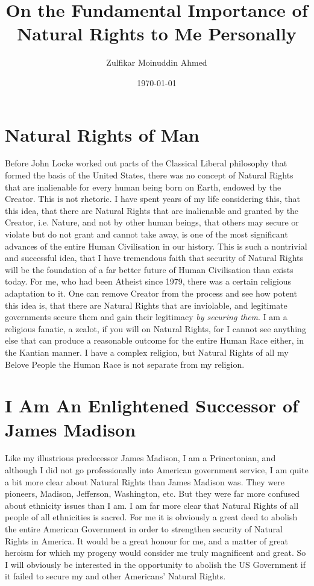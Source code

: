 \documentclass{amsart}
\title{On the Fundamental Importance of Natural Rights to Me Personally}
\author{Zulfikar Moinuddin Ahmed}
\date{\today}
\begin{document}
\maketitle

\section{Natural Rights of Man}

Before John Locke worked out parts of the Classical Liberal philosophy that formed the basis of the United States, there was no concept of Natural Rights that are inalienable for every human being born on Earth, endowed by the Creator.  This is not rhetoric.  I have spent years of my life considering this, that this idea, that there are Natural Rights that are inalienable and granted by the Creator, i.e. Nature, and not by other human beings, that others may secure or violate but do not grant and cannot take away, is one of the most significant advances of the entire Human Civilisation in our history.  This is such a nontrivial and successful idea, that I have tremendous faith that security of Natural Rights will be the foundation of a far better future of Human Civilisation than exists today.  For me, who had been Atheist since 1979, there was a certain religious adaptation to it.  One can remove Creator from the process and see how potent this idea is, that there are Natural Rights that are inviolable, and legitimate governments secure them and gain their legitimacy {\em by securing them}.  I am a religious fanatic, a zealot, if you will on Natural Rights, for I cannot see anything else that can produce a reasonable outcome for the entire Human Race either, in the Kantian manner.  I have a complex religion, but Natural Rights of all my Belove People the Human Race is not separate from my religion.

\section{I Am An Enlightened Successor of James Madison}

Like my illustrious predecessor James Madison, I am a Princetonian, and although I did not go professionally into American government service, I am quite a bit more clear about Natural Rights than James Madison was.  They were pioneers, Madison, Jefferson, Washington, etc.  But they were far more confused about ethnicity issues than I am.  I am far more clear that Natural Rights of all people of all ethnicities is sacred.  For me it is obviously a great deed to abolish the entire American Government in order to strengthen security of Natural Rights in America.  It would be a great honour for me, and a matter of great heroism for which my progeny would consider me truly magnificent and great.  So I will obviously be interested in the opportunity to abolish the US Government if it failed to secure my and other Americans' Natural Rights.
\end{document}
